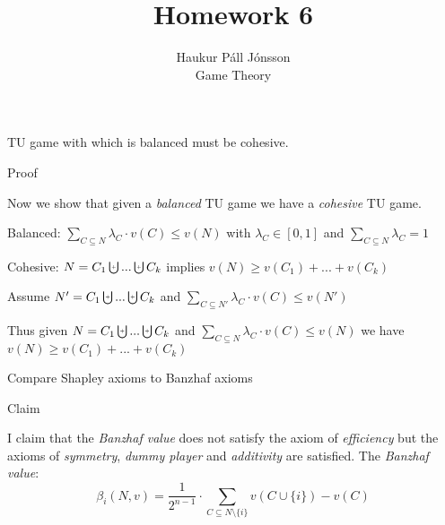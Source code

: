 \documentclass[12pt]{article}
\newenvironment{question}[2][Question]{\begin{trivlist}
\item[\hskip \labelsep {\bfseries #1}\hskip \labelsep {\bfseries #2.}]}{\end{trivlist}}
\newenvironment{answer}[2][Answer]{\begin{trivlist}
\item[\hskip \labelsep {\bfseries #1}\hskip \labelsep {\bfseries #2:}]}{\end{trivlist}}
\begin{document}
\renewcommand{\theenumi}{\roman{enumi}}

\let\oldsum\sum
\renewcommand{\sum}[3]{\oldsum\limits_{#1}^{#2}#3}
\let\oldprod\prod
\renewcommand{\prod}[3]{\oldprod\limits_{#1}^{#2}#3}

\newcommand\Dunion{
  \mathop{\mathchoice
    {\ooalign{$\displaystyle\bigcup$\cr\hss\scalebox{.65}{\raisebox{0.45ex}{\sffamily +}}\hss}}
    {\ooalign{$\textstyle\bigcup$\cr\hss\scalebox{.9}{\raisebox{0.5ex}{\tiny\sffamily +}}\hss}}
    {\ooalign{$\scriptstyle\bigcup$\cr\hss\scalebox{.45}{\raisebox{0.3ex}{\sffamily +}}\hss}}
    {\ooalign{$\scriptscriptstyle\bigcup$\cr\hss\scalebox{.38}{\raisebox{0.3ex}{\sffamily +}}\hss}}
    }
}

\title{Homework 6}
\author{Haukur Páll Jónsson\\
Game Theory}

\maketitle

\begin{question}{1}
TU game with which is balanced must be cohesive.
\end{question}
\begin{answer}{a)}{Proof}

Now we show that given a \textit{balanced} TU game we have a \textit{cohesive} TU game.

Balanced: $\sum{C \subseteq N}{}{\lambda_C \cdot v(C)} \leq v(N)$ with $\lambda_C \in [0,1]$ and $\sum{C \subseteq N}{}{\lambda_C}=1$

Cohesive: $N = C_1 \Dunion ... \Dunion C_k$ implies $v(N) \geq v(C_1) + ... + v(C_k)$

Assume $N' = C_1 \Dunion ... \Dunion C_k$ and $\sum{C \subseteq N'}{}{\lambda_C \cdot v(C)} \leq v(N')$

Thus given $N = C_1 \Dunion ... \Dunion C_k$ and $\sum{C \subseteq N}{}{\lambda_C \cdot v(C)} \leq v(N)$ we have $v(N) \geq v(C_1) + ... + v(C_k)$
\end{answer}

\begin{question}{2}
Compare Shapley axioms to Banzhaf axioms
\end{question}
\begin{answer}{a-d)}{Claim}

I claim that the \textit{Banzhaf value} does not satisfy the axiom of \textit{efficiency} but the axioms of \textit{symmetry}, \textit{dummy player} and \textit{additivity} are satisfied. The \textit{Banzhaf value}:
$$\beta_i(N,v)=\frac{1}{2^{n-1}}\cdot \sum{C \subseteq N \setminus \{i\}}{}{v(C \cup \{i\}) - v(C)}$$
\end{answer}
\end{document}
